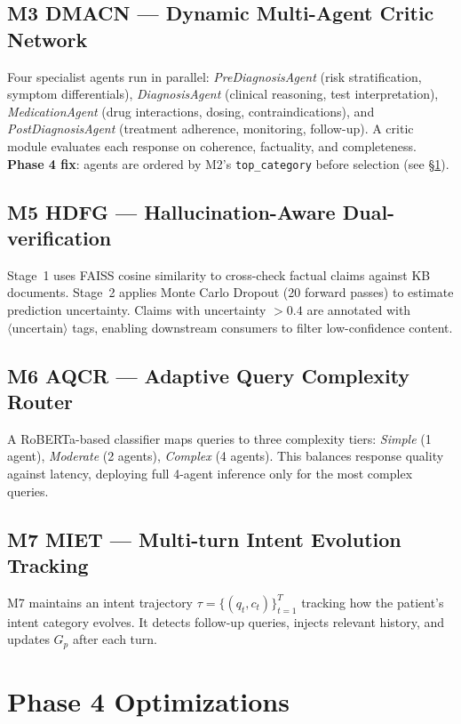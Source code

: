 \documentclass[conference]{IEEEtran}
\begin{document}
\subsection{M3 DMACN — Dynamic Multi-Agent Critic Network}
Four specialist agents run in parallel: \textit{PreDiagnosisAgent} (risk stratification, symptom differentials), \textit{DiagnosisAgent} (clinical reasoning, test interpretation), \textit{MedicationAgent} (drug interactions, dosing, contraindications), and \textit{PostDiagnosisAgent} (treatment adherence, monitoring, follow-up). A critic module evaluates each response on coherence, factuality, and completeness. \textbf{Phase 4 fix}: agents are ordered by M2's \texttt{top\_category} before selection (see \S\ref{sec:phase4}).

\subsection{M5 HDFG — Hallucination-Aware Dual-verification}
Stage~1 uses FAISS cosine similarity to cross-check factual claims against KB documents. Stage~2 applies Monte Carlo Dropout (20 forward passes) to estimate prediction uncertainty. Claims with uncertainty $>0.4$ are annotated with $\langle\text{uncertain}\rangle$ tags, enabling downstream consumers to filter low-confidence content.

\subsection{M6 AQCR — Adaptive Query Complexity Router}
A RoBERTa-based classifier maps queries to three complexity tiers: \textit{Simple} (1 agent), \textit{Moderate} (2 agents), \textit{Complex} (4 agents). This balances response quality against latency, deploying full 4-agent inference only for the most complex queries.

\subsection{M7 MIET — Multi-turn Intent Evolution Tracking}
M7 maintains an intent trajectory $\tau = \{(q_t, c_t)\}_{t=1}^T$ tracking how the patient's intent category evolves. It detects follow-up queries, injects relevant history, and updates $G_p$ after each turn.

\section{Phase 4 Optimizations}
\label{sec:phase4}
\end{document}
